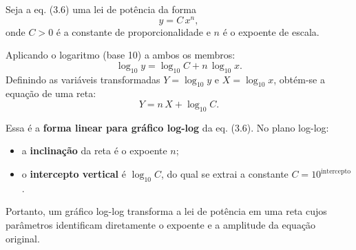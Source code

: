 Seja a eq. (3.6) uma lei de potência da forma
\[
y = C\,x^{n},
\]
onde $C > 0$ é a constante de proporcionalidade e $n$ é o expoente de escala.

Aplicando o logaritmo (base 10) a ambos os membros:
\[
\log_{10} y = \log_{10} C + n\,\log_{10} x.
\]
Definindo as variáveis transformadas $Y = \log_{10} y$ e $X = \log_{10} x$, obtém-se a equação de uma reta:
\[
Y = n\,X + \log_{10} C.
\]

Essa é a \textbf{forma linear para gráfico log-log} da eq. (3.6). No plano log-log:
\begin{itemize}
\item a \textbf{inclinação} da reta é o expoente $n$;
\item o \textbf{intercepto vertical} é $\log_{10} C$, do qual se extrai a constante $C = 10^{\mathrm{intercepto}}$.
\end{itemize}

Portanto, um gráfico log-log transforma a lei de potência em uma reta cujos parâmetros identificam diretamente o expoente e a amplitude da equação original.

